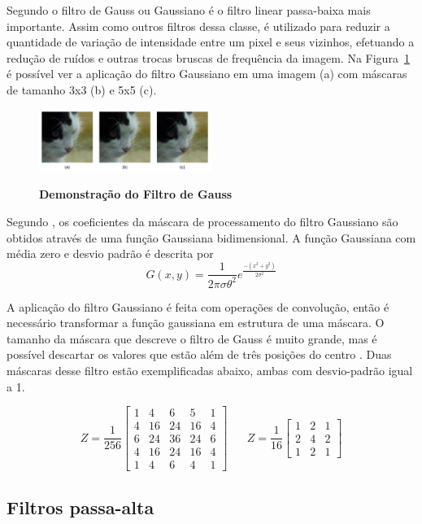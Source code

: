 \documentclass[12pt,oneside,a4paper,english,french,spanish,brazil,]{abntex2}
\begin{document}
Segundo \citet{conci:2003} o filtro de Gauss ou Gaussiano é o filtro linear passa-baixa mais importante. Assim como outros filtros dessa classe, é utilizado para reduzir a quantidade de variação de intensidade entre um pixel e seus vizinhos, efetuando a redução de ruídos e outras trocas bruscas de frequência da imagem. Na Figura~\ref{fig:PDI_Gauss} é possível ver a aplicação do filtro Gaussiano em uma imagem (a) com máscaras de tamanho 3x3 (b) e 5x5 (c).

\begin{figure}[ht]
\centering
\caption{\textbf{Demonstração do Filtro de Gauss}}
\includegraphics[width=0.5\textwidth]{imagens/PDI_Gauss.pdf}
\sourceAuthor
\label{fig:PDI_Gauss}
\end{figure}

Segundo \citet{pedrini:2008}, os coeficientes da máscara de processamento do filtro Gaussiano são obtidos através de uma função Gaussiana bidimensional. A função Gaussiana com média zero e desvio padrão é descrita por \[G(x,y)=\frac{1}{2\pi\sigma\theta^2} e^{\frac{-(x^2+y^2)}{2\sigma^2}  }\]

A aplicação do filtro Gaussiano é feita com operações de convolução, então é necessário transformar a função gaussiana em estrutura de uma máscara. O tamanho da máscara que descreve o filtro de Gauss é muito grande, mas é possível descartar os valores que estão além de três posições do centro \cite{conci:2003}. Duas máscaras desse filtro estão exemplificadas abaixo, ambas com desvio-padrão igual a 1.

\[Z=\frac{1}{256}\begin{bmatrix}
1 & 4 & 6 & 5 & 1\\ 
4 & 16 & 24 & 16 & 4\\ 
6 & 24 & 36 & 24 & 6\\ 
4 & 16 & 24 & 16 & 4\\ 
1 & 4 & 6 & 4 & 1
\end{bmatrix}
\; \; \; \; \; \; 
Z=\frac{1}{16}\begin{bmatrix}
1 & 2 & 1\\ 
2 & 4 & 2\\ 
1 & 2 & 1
\end{bmatrix}
\]

\subsection{Filtros passa-alta}
\end{document}
